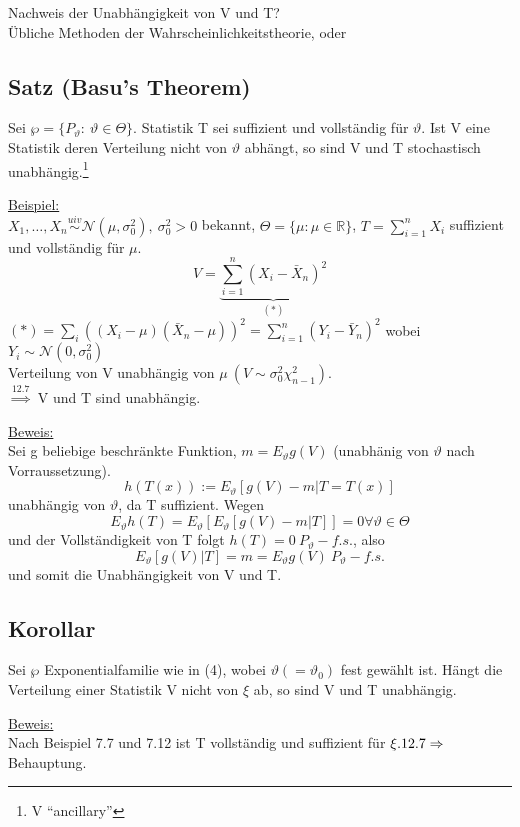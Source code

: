 \documentclass[a4paper,11pt,twoside,titlepage]{article}
\newcommand{\R}{{\mathbb R}}
\newcommand\NN{ \mathcal{N} } %
\newcommand{\uiv}{\ensuremath{\stackrel{uiv}{\sim}}}
\begin{document}
Nachweis der Unabhängigkeit von V und T?\\
Übliche Methoden der Wahrscheinlichkeitstheorie, oder
 
\subsection{Satz (Basu's Theorem)}
Sei $\wp=\{P_\vartheta:\ \vartheta\in\Theta\}$. Statistik T sei suffizient und vollständig
für $\vartheta$. Ist V eine Statistik deren Verteilung nicht von $\vartheta$ abhängt, so
sind V und T stochastisch unabhängig.\footnote{V "`ancillary"'}

\underline{Beispiel:}\\
$X_1,\ldots,X_n\uiv\NN(\mu,\sigma_0^2),\ \sigma_0^2>0$ bekannt, $\Theta=\{\mu:\mu\in\R\}$, $T=\sum_{i=1}^nX_i$ suffizient und vollständig für $\mu$.
$$V=\underbrace{\sum_{i=1}^n(X_i-\bar{X}_n)^2}_{(\ast)}$$ 
$(\ast)=\sum_i((X_i-\mu)(\bar{X}_n-\mu))^2=\sum_{i=1}^n(Y_i-\bar{Y}_n)^2$ wobei $Y_i\sim\NN(0,\sigma_0^2)$\\
Verteilung von V unabhängig von $\mu\ (V\sim\sigma_0^2\chi^2_{n-1})$.\\
$\stackrel{12.7}{\Rightarrow}$ V und T sind unabhängig.

\underline{Beweis:}\\
Sei g beliebige beschränkte Funktion, $m=E_\vartheta g(V)$ (unabhänig von $\vartheta$ nach Vorraussetzung).
$$h(T(x)):=E_\vartheta[g(V)-m|T=T(x)]$$ unabhängig von $\vartheta$, da T suffizient. Wegen $$E_\vartheta h(T)=E_\vartheta[E_\vartheta[g(V)-m|T]]=0\forall\vartheta\in\Theta$$
und der Vollständigkeit von T folgt $h(T)=0\ P_\vartheta-f.s.$, 
also $$E_\vartheta[g(V)|T]=m=E_\vartheta g(V)\ P_\vartheta-f.s.$$
und somit die Unabhängigkeit von V und T.

\subsection{Korollar}
Sei $\wp$ Exponentialfamilie wie in (4), wobei $\vartheta(=\vartheta_0)$ fest gewählt ist. Hängt die
Verteilung einer Statistik V nicht von $\xi$ ab, so sind V und T unabhängig.

\underline{Beweis:}\\
Nach Beispiel 7.7 und 7.12 ist T vollständig und suffizient für $\xi .\\ 12.7\Rightarrow$ Behauptung.
\end{document}
